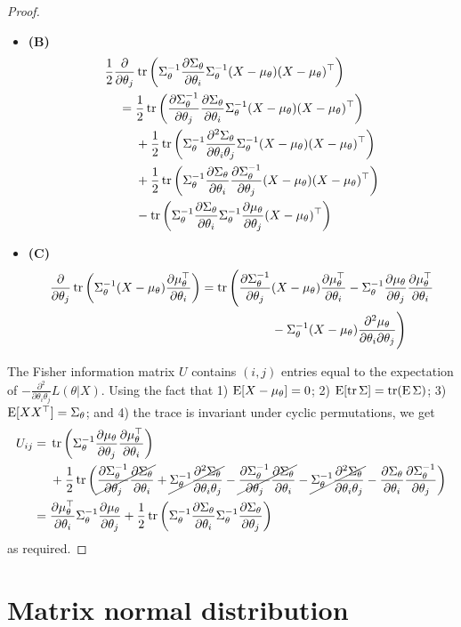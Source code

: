 \begin{proof}
\begin{itemize}
  \item \textbf{(B)}
  \begin{align*}
    \half \frac{\partial}{\partial \theta_j}  
    &\tr \left( 
    \Sigma_\theta^{-1} \dSi \Sigma_\theta^{-1} \Xmu\Xmu^\top 
    \right)  \\
    ={}& \half \tr \left( 
    \dSjnv \dSi \Sigma_\theta^{-1} \Xmu\Xmu^\top
    \right) \\
    & +\half \tr \left( 
    \Sigma_\theta^{-1} \dStwo \Sigma_\theta^{-1} \Xmu\Xmu^\top
    \right) \\
    & +\half \tr \left( 
    \Sigma_\theta^{-1} \dSi \dSjnv \Xmu\Xmu^\top
    \right) \\
    & - \tr \left( 
    \Sigma_\theta^{-1} \dSi \Sigma_\theta^{-1} \dmuj\Xmu^\top
    \right)
  \end{align*}
  
  \item \textbf{(C)}
  \begin{align*}
    \frac{\partial}{\partial \theta_j}  \tr \left( 
    \Sigma_\theta^{-1}\Xmu\dmuitop 
    \right) 
    &= \tr \Bigg( 
    \dSjnv \Xmu\dmuitop 
    -
    \Sigma_\theta^{-1} \dmuj \dmuitop \\
    &\hspace{2cm} - \Sigma_\theta^{-1}\Xmu\dmutwo \Bigg)
  \end{align*}
\end{itemize}

The Fisher information matrix $U$ contains $(i,j)$ entries equal to the expectation of $-\frac{\partial^2}{\partial \theta_i\theta_j} L(\theta|X)$. 
Using the fact that 1) $\E[X-\mu_\theta]=0$; 2) $\E [\tr \Sigma] = \tr (\E \Sigma)$; 3) $\E [XX^\top] = \Sigma_\theta$; and 4) the trace is invariant under cyclic permutations, we get
\begin{align*}
  U_{ij} 
  ={}& \tr \left( \Sigma_\theta^{-1} \dmuj \dmuitop \right)   \\
  & + \half \tr \left( 
  \cancel{\dSjnv \dSi} + \cancel{\Sigma_\theta^{-1}\dStwo}
  - \cancel{\dSjnv \dSi}  - \cancel{\Sigma_\theta^{-1}\dStwo} -  \dSi\dSjnv \right) \\
  ={}&  \dmuitop \Sigma_\theta^{-1} \dmuj + \half \tr \left(\Sigma_\theta^{-1} \dSi \Sigma_\theta^{-1} \dSj \right)
\end{align*}
as required.  \qedhere

\end{proof}

\section{Matrix normal distribution}
\label{apx:matrixnormal}


